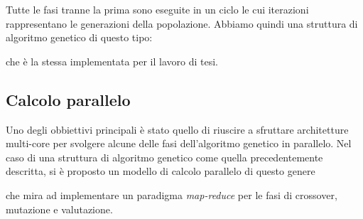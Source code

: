 Tutte le fasi tranne la prima sono eseguite in un ciclo le cui iterazioni
rappresentano le generazioni della popolazione. Abbiamo quindi una struttura
di algoritmo genetico di questo tipo:

% 	

che è la stessa implementata per il lavoro di tesi.

\subsection{Calcolo parallelo}

Uno degli obbiettivi principali è stato quello di riuscire a sfruttare
architetture multi-core per svolgere alcune delle fasi dell'algoritmo genetico
in parallelo. Nel caso di una struttura di algoritmo genetico come quella
precedentemente descritta, si è proposto un modello di calcolo parallelo di
questo genere

% 	

che mira ad implementare un paradigma \textit{map-reduce} per le fasi di
crossover, mutazione e valutazione.